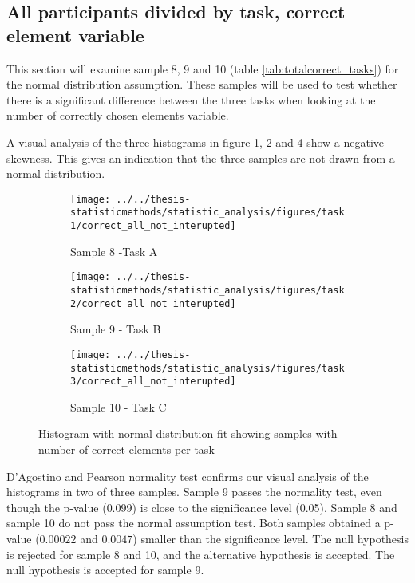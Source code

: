 \begin{appendices}
\section{All participants divided by task,  correct element variable}\label{app:norm_8_9_10}

This section will examine sample 8, 9 and 10 (table \ref{tab:totalcorrect_tasks}) for the normal distribution assumption. These samples will be used to test whether there is a significant difference between the three tasks when looking at the number of correctly chosen elements variable. 

A visual analysis of the three histograms in figure \ref{fig:correctallnotinterupted_task1}, \ref{fig:correctallnotinterupted_task2} and \ref{fig:correctallnotinterupted_task3} show a negative skewness. This gives an indication that the three samples are not drawn from a normal distribution.

\begin{figure}[H]
	\centering
	\begin{subfigure}[b]{0.32\linewidth}
		\centering
		\texttt{[image: ../../thesis-statisticmethods/statistic\_analysis/figures/task1/correct\_all\_not\_interupted]}
		\caption{Sample 8 -Task A}
		\label{fig:correctallnotinterupted_task1}
	\end{subfigure}
	\begin{subfigure}[b]{0.32\linewidth}
		\centering
		\texttt{[image: ../../thesis-statisticmethods/statistic\_analysis/figures/task2/correct\_all\_not\_interupted]}
		\caption{Sample 9 - Task B}
		\label{fig:correctallnotinterupted_task2}
	\end{subfigure}
	\begin{subfigure}[b]{0.32\linewidth}
		\centering
		\texttt{[image: ../../thesis-statisticmethods/statistic\_analysis/figures/task3/correct\_all\_not\_interupted]}
		\caption{Sample 10 - Task C}
		\label{fig:correctallnotinterupted_task3}
	\end{subfigure}
	\caption{Histogram with normal distribution fit showing samples with number of correct elements per task}
\end{figure}
D'Agostino and Pearson normality test confirms our visual analysis of the histograms in two of three samples. Sample 9 passes the normality test, even though the p-value ($0.099$) is close to the significance level (0.05). Sample 8 and sample 10 do not pass the normal assumption test. Both samples obtained a p-value ($0.00022$ and $0.0047$) smaller than the significance level. The null hypothesis is rejected for sample 8 and 10, and the alternative hypothesis is accepted. The null hypothesis is accepted for sample 9. 


\end{appendices}
